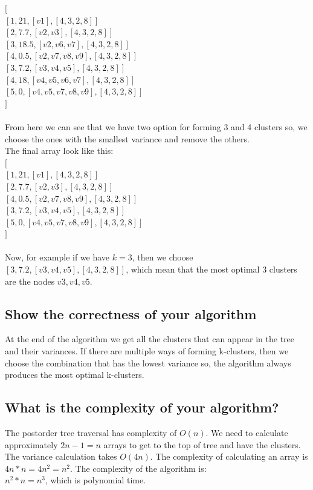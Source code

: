\documentclass[11pt]{article}
\begin{document}
$ [ $ \\
$ [1, 21, [v1], [4, 3, 2, 8]] $ \\
$ [2, 7.7, [v2, v3], [4, 3, 2, 8]] $ \\
$ [3, 18.5, [v2, v6, v7], [4, 3, 2, 8]] $ \\
$ [4, 0.5, [v2, v7, v8, v9], [4, 3, 2, 8]] $ \\
$ [3, 7.2, [v3, v4, v5], [4, 3, 2, 8]] $ \\
$ [4, 18, [v4, v5, v6, v7], [4, 3, 2, 8]] $ \\
$ [5, 0 , [v4, v5, v7, v8, v9], [4, 3, 2, 8]] $ \\
$ ] $ \\~\\
From here we can see that we have two option for forming 3 and 4 clusters so, we choose the ones with the smallest variance and remove the others. \\
The final array look like this: \\
$ [ $ \\
$ [1, 21, [v1], [4, 3, 2, 8]] $ \\
$ [2, 7.7, [v2, v3], [4, 3, 2, 8]] $ \\
$ [4, 0.5, [v2, v7, v8, v9], [4, 3, 2, 8]] $ \\
$ [3, 7.2, [v3, v4, v5], [4, 3, 2, 8]] $ \\
$ [5, 0 , [v4, v5, v7, v8, v9], [4, 3, 2, 8]] $ \\
$ ] $ \\~\\

Now, for example if we have $ k=3 $, then we choose $ [3, 7.2, [v3, v4, v5], [4, 3, 2, 8]] $, which mean that the most optimal 3 clusters are the nodes $ v3, v4, v5 $.

\subsection{Show the correctness of your algorithm}
At the end of the algorithm we get all the clusters that can appear in the tree and their variances. If there are multiple ways of forming k-clusters, then we choose the combination that has the lowest variance so, the algorithm always produces the most optimal k-clusters.

\subsection{What is the complexity of your algorithm?}
The postorder tree traversal has complexity of $ O(n) $. We need to calculate approximately $2n - 1 = n$ arrays to get to the top of tree and have the clusters. The variance calculation takes $ O(4n) $. The complexity of calculating an array is $ 4n * n  = 4n^2 = n^2 $. The complexity of the algorithm is: \\
$ n^2 * n = n^3 $, which is polynomial time.
\end{document}
